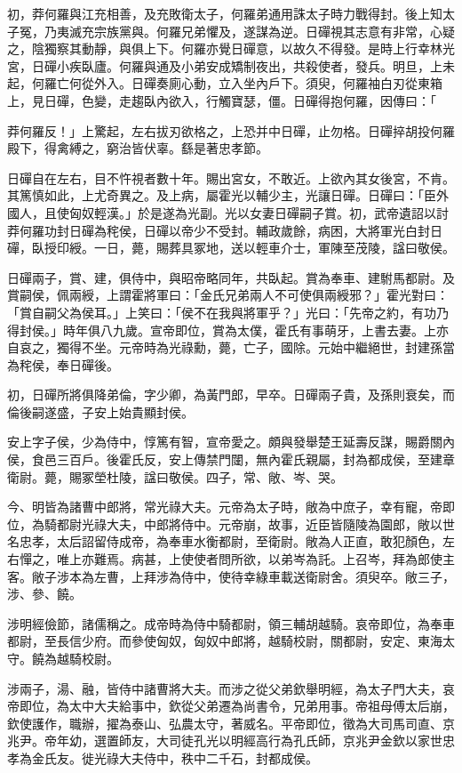 \begin{pinyinscope}
初，莽何羅與江充相善，及充敗衛太子，何羅弟通用誅太子時力戰得封。後上知太子冤，乃夷滅充宗族黨與。何羅兄弟懼及，遂謀為逆。日磾視其志意有非常，心疑之，陰獨察其動靜，與俱上下。何羅亦覺日磾意，以故久不得發。是時上行幸林光宮，日磾小疾臥廬。何羅與通及小弟安成矯制夜出，共殺使者，發兵。明旦，上未起，何羅亡何從外入。日磾奏廁心動，立入坐內戶下。須臾，何羅袖白刃從東箱上，見日磾，色變，走趨臥內欲入，行觸寶瑟，僵。日磾得抱何羅，因傳曰：「

莽何羅反！」上驚起，左右拔刃欲格之，上恐并中日磾，止勿格。日磾捽胡投何羅殿下，得禽縛之，窮治皆伏辜。繇是著忠孝節。

日磾自在左右，目不忤視者數十年。賜出宮女，不敢近。上欲內其女後宮，不肯。其篤慎如此，上尤奇異之。及上病，屬霍光以輔少主，光讓日磾。日磾曰：「臣外國人，且使匈奴輕漢。」於是遂為光副。光以女妻日磾嗣子賞。初，武帝遺詔以討莽何羅功封日磾為秺侯，日磾以帝少不受封。輔政歲餘，病困，大將軍光白封日磾，臥授印綬。一日，薨，賜葬具冢地，送以輕車介士，軍陳至茂陵，諡曰敬侯。

日磾兩子，賞、建，俱侍中，與昭帝略同年，共臥起。賞為奉車、建駙馬都尉。及賞嗣侯，佩兩綬，上謂霍將軍曰：「金氏兄弟兩人不可使俱兩綬邪？」霍光對曰：「賞自嗣父為侯耳。」上笑曰：「侯不在我與將軍乎？」光曰：「先帝之約，有功乃得封侯。」時年俱八九歲。宣帝即位，賞為太僕，霍氏有事萌牙，上書去妻。上亦自哀之，獨得不坐。元帝時為光祿勳，薨，亡子，國除。元始中繼絕世，封建孫當為秺侯，奉日磾後。

初，日磾所將俱降弟倫，字少卿，為黃門郎，早卒。日磾兩子貴，及孫則衰矣，而倫後嗣遂盛，子安上始貴顯封侯。

安上字子侯，少為侍中，惇篤有智，宣帝愛之。頗與發舉楚王延壽反謀，賜爵關內侯，食邑三百戶。後霍氏反，安上傳禁門闥，無內霍氏親屬，封為都成侯，至建章衛尉。薨，賜冢塋杜陵，諡曰敬侯。四子，常、敞、岑、哭。

今、明皆為諸曹中郎將，常光祿大夫。元帝為太子時，敞為中庶子，幸有寵，帝即位，為騎都尉光祿大夫，中郎將侍中。元帝崩，故事，近臣皆隨陵為園郎，敞以世名忠孝，太后詔留侍成帝，為奉車水衡都尉，至衛尉。敞為人正直，敢犯顏色，左右憚之，唯上亦難焉。病甚，上使使者問所欲，以弟岑為託。上召岑，拜為郎使主客。敞子涉本為左曹，上拜涉為侍中，使待幸綠車載送衛尉舍。須臾卒。敞三子，涉、參、饒。

涉明經儉節，諸儒稱之。成帝時為侍中騎都尉，領三輔胡越騎。哀帝即位，為奉車都尉，至長信少府。而參使匈奴，匈奴中郎將，越騎校尉，關都尉，安定、東海太守。饒為越騎校尉。

涉兩子，湯、融，皆侍中諸曹將大夫。而涉之從父弟欽舉明經，為太子門大夫，哀帝即位，為太中大夫給事中，欽從父弟遷為尚書令，兄弟用事。帝祖母傅太后崩，欽使護作，職辦，擢為泰山、弘農太守，著威名。平帝即位，徵為大司馬司直、京兆尹。帝年幼，選置師友，大司徒孔光以明經高行為孔氏師，京兆尹金欽以家世忠孝為金氏友。徙光祿大夫侍中，秩中二千石，封都成侯。


\end{pinyinscope}
